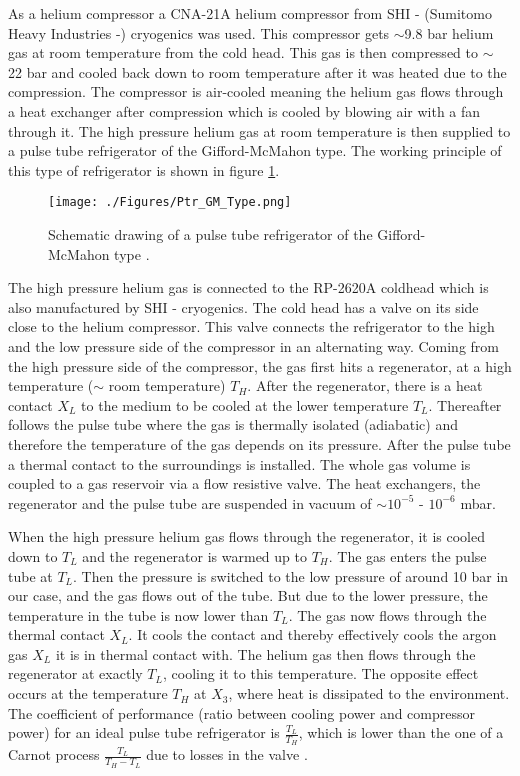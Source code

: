 As a helium compressor a CNA-21A helium compressor from SHI - (Sumitomo Heavy Industries -) cryogenics was used. This compressor gets $\sim$9.8 bar helium gas at room temperature from the cold head. This gas is then compressed to $\sim$ 22 bar and cooled back down to room temperature after it was heated due to the compression. The compressor is air-cooled meaning the helium gas flows through a heat exchanger after compression which is cooled by blowing air with a fan through it. The high pressure helium gas at room temperature is then supplied to a pulse tube refrigerator of the Gifford-McMahon type. The working principle of this type of refrigerator is shown in figure \ref{fig:ptr}.
\begin{figure}[h]
 \centering
 \texttt{[image: ./Figures/Ptr\_GM\_Type.png]}
 \caption{Schematic drawing of a pulse tube refrigerator of the Gifford-McMahon type \cite{DeWaele2000}.}
 \label{fig:ptr}
\end{figure}
The high pressure helium gas is connected to the RP-2620A coldhead which is also manufactured by SHI - cryogenics. The cold head has a valve on its side close to the helium compressor. This valve connects the refrigerator to the high and the low pressure side of the compressor in an alternating way. Coming from the high pressure side of the compressor, the gas first hits a regenerator, at a high temperature ($\sim$ room temperature) $T_{H}$. After the regenerator, there is a heat contact $X_{L}$ to the medium to be cooled at the lower temperature $T_{L}$. Thereafter follows the pulse tube where the gas is thermally isolated (adiabatic) and therefore the temperature of the gas depends on its pressure. After the pulse tube a thermal contact to the surroundings is installed. The whole gas volume is coupled to a gas reservoir via a flow resistive valve. The heat exchangers, the regenerator and the pulse tube are suspended in vacuum of $\sim 10^{-5}$ - $10^{-6}$ mbar. 

When the high pressure helium gas flows through the regenerator, it is cooled down to $T_{L}$ and the regenerator is warmed up to $T_{H}$. The gas enters the pulse tube at $T_{L}$. Then the pressure is switched to the low pressure of around 10 bar in our case, and the gas flows out of the tube. But due to the lower pressure, the temperature in the tube is now lower than $T_{L}$. The gas now flows through the thermal contact $X_{L}$. It cools the contact and thereby effectively cools the argon gas $X_{L}$ it is in thermal contact with. The helium gas then flows through the regenerator at exactly $T_{L}$, cooling it to this temperature. The opposite effect occurs at the temperature $T_{H}$ at $X_{3}$, where heat is dissipated to the environment. The coefficient of performance (ratio between cooling power and compressor power) for an ideal pulse tube refrigerator is $\frac{T_{L}}{T_{H}}$, which is lower than the one of a Carnot process $\frac{T_{L}}{T_{H} - T_{L}}$ due to losses in the valve \cite{DeWaele2000}.


